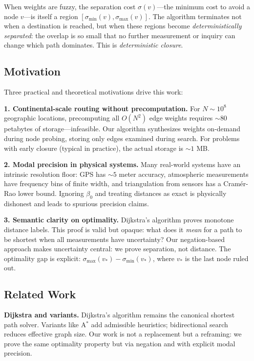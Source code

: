 \documentclass[twocolumn,11pt,a4paper]{article}
\theoremstyle{definition}
\begin{document}
When weights are fuzzy, the separation cost $\sigma(v)$---the minimum cost to avoid a node $v$---is itself a region $[\sigma_{\min}(v), \sigma_{\max}(v)]$. The algorithm terminates not when a destination is reached, but when these regions become \emph{deterministically separated}: the overlap is so small that no further measurement or inquiry can change which path dominates. This is \emph{deterministic closure}.

\subsection{Motivation}

Three practical and theoretical motivations drive this work:

\textbf{1. Continental-scale routing without precomputation.} For $N \sim 10^8$ geographic locations, precomputing all $O(N^2)$ edge weights requires $\sim 80$ petabytes of storage---infeasible. Our algorithm synthesizes weights on-demand during node probing, storing only edges examined during search. For problems with early closure (typical in practice), the actual storage is $\sim 1$ MB.

\textbf{2. Modal precision in physical systems.} Many real-world systems have an intrinsic resolution floor: GPS has $\sim 5$ meter accuracy, atmospheric measurements have frequency bins of finite width, and triangulation from sensors has a Cramér-Rao lower bound. Ignoring $\beta_0$ and treating distances as exact is physically dishonest and leads to spurious precision claims.

\textbf{3. Semantic clarity on optimality.} Dijkstra's algorithm proves monotone distance labels. This proof is valid but opaque: what does it \emph{mean} for a path to be shortest when all measurements have uncertainty? Our negation-based approach makes uncertainty central: we prove separation, not distance. The optimality gap is explicit: $\sigma_{\max}(v_*) - \sigma_{\min}(v_*)$, where $v_*$ is the last node ruled out.

\subsection{Related Work}

\textbf{Dijkstra and variants.} Dijkstra's algorithm \cite{dijkstra1959} remains the canonical shortest path solver. Variants like A$^*$ \cite{hart1968,hart1968a} add admissible heuristics; bidirectional search \cite{goldberg1997} reduces effective graph size. Our work is not a replacement but a reframing: we prove the same optimality property but via negation and with explicit modal precision.
\end{document}
